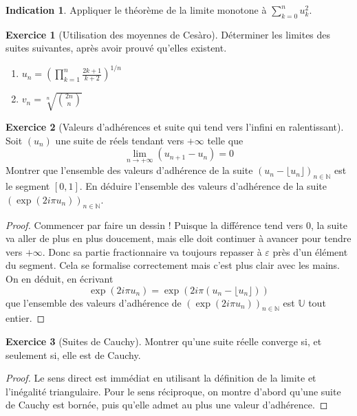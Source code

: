\documentclass[french]{book}
\newcommand{\N}{\mathbb{N}}
\newcommand{\U}{\mathbb{U}}
\theoremstyle{definition}
\newtheorem{ex}{Exercice}[chapter]
\theoremstyle{theorem}
\newtheorem*{ind}{Indication}
\theoremstyle{remark}
\begin{document}
\begin{ind}
	Appliquer le théorème de la limite monotone à $\displaystyle\sum_{k=0}^{n}u_k^2$.
\end{ind}

\begin{ex}[Utilisation des moyennes de Cesàro]
	Déterminer les limites des suites suivantes, après avoir prouvé qu'elles existent.
	\begin{enumerate}
		\item $u_n=\displaystyle\left(\prod_{k=1}^{n}\frac{2k+1}{k+2}\right)^{1/n}$
		\item $v_n=\displaystyle\sqrt[n]{\binom{2n}{n}}$
	\end{enumerate}
\end{ex}

\begin{ex}[Valeurs d'adhérences et suite qui tend vers l'infini en ralentissant]
	Soit $(u_n)$ une suite de réels tendant vers $+\infty$ telle que $$\lim_{n\to+\infty}(u_{n+1}-u_n)=0$$ Montrer que l'ensemble des valeurs d'adhérence de la suite $(u_n-\lfloor u_n\rfloor)_{n\in\N}$ est le segment $[0,1]$. En déduire l'ensemble des valeurs d'adhérence de la suite $\left(\exp(2i\pi u_n)\right)_{n\in\N}$.
\end{ex}

\begin{proof}
	Commencer par faire un dessin ! Puisque la différence tend vers $0$, la suite va aller de plus en plus doucement, mais elle doit continuer à avancer pour tendre vers $+\infty$. Donc sa partie fractionnaire va toujours repasser à $\varepsilon$ près d'un élément du segment. Cela se formalise correctement mais c'est plus clair avec les mains. On en déduit, en écrivant $$\exp(2i\pi u_n)=\exp(2i\pi (u_n-\lfloor u_n\rfloor))$$ que l'ensemble des valeurs d'adhérence de $\left(\exp(2i\pi u_n)\right)_{n\in\N}$ est $\U$ tout entier.
\end{proof}

\begin{ex}[Suites de Cauchy]
	Montrer qu'une suite réelle converge si, et seulement si, elle est de Cauchy.
\end{ex}

\begin{proof}
	Le sens direct est immédiat en utilisant la définition de la limite et l'inégalité triangulaire. Pour le sens réciproque, on montre d'abord qu'une suite de Cauchy est bornée, puis qu'elle admet au plus une valeur d'adhérence.
\end{proof}
\end{document}
